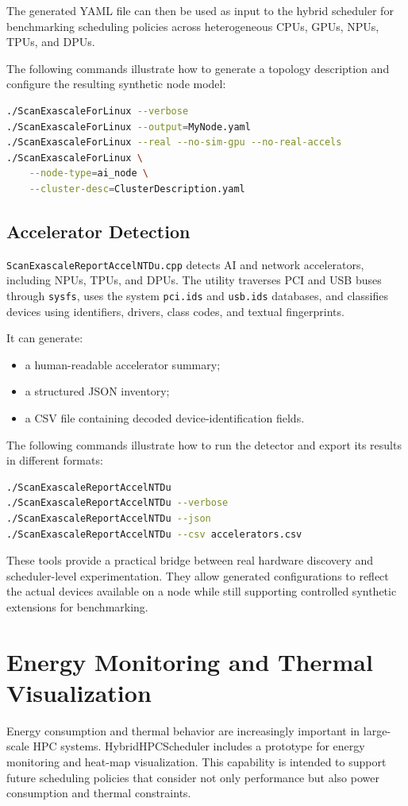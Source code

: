 \documentclass[conference]{IEEEtran}
\begin{document}
The generated YAML file can then be used as input to the hybrid scheduler for
benchmarking scheduling policies across heterogeneous CPUs, GPUs, NPUs, TPUs,
and DPUs.

The following commands illustrate how to generate a topology description and
configure the resulting synthetic node model:

\begin{lstlisting}[language=bash]
./ScanExascaleForLinux --verbose
./ScanExascaleForLinux --output=MyNode.yaml
./ScanExascaleForLinux --real --no-sim-gpu --no-real-accels
./ScanExascaleForLinux \
    --node-type=ai_node \
    --cluster-desc=ClusterDescription.yaml
\end{lstlisting}

\subsection{Accelerator Detection}
\texttt{ScanExascaleReportAccelNTDu.cpp} detects AI and network accelerators,
including NPUs, TPUs, and DPUs. The utility traverses PCI and USB buses through
\texttt{sysfs}, uses the system \texttt{pci.ids} and \texttt{usb.ids}
databases, and classifies devices using identifiers, drivers, class codes, and
textual fingerprints.

It can generate:
\begin{itemize}
    \item a human-readable accelerator summary;
    \item a structured JSON inventory;
    \item a CSV file containing decoded device-identification fields.
\end{itemize}

The following commands illustrate how to run the detector and export its
results in different formats:

\begin{lstlisting}[language=bash]
./ScanExascaleReportAccelNTDu
./ScanExascaleReportAccelNTDu --verbose
./ScanExascaleReportAccelNTDu --json
./ScanExascaleReportAccelNTDu --csv accelerators.csv
\end{lstlisting}

These tools provide a practical bridge between real hardware discovery and
scheduler-level experimentation. They allow generated configurations to reflect
the actual devices available on a node while still supporting controlled
synthetic extensions for benchmarking.

\section{Energy Monitoring and Thermal Visualization}
Energy consumption and thermal behavior are increasingly important in
large-scale HPC systems. HybridHPCScheduler includes a prototype for energy
monitoring and heat-map visualization. This capability is intended to support
future scheduling policies that consider not only performance but also power
consumption and thermal constraints.
\end{document}
